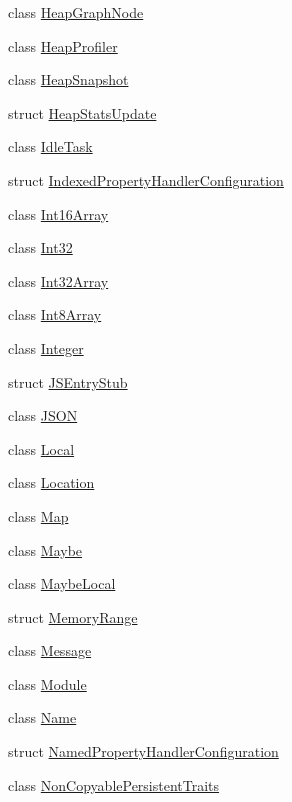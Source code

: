 \begin{DoxyCompactItemize}
\item 
class \mbox{\hyperlink{classv8_1_1HeapGraphNode}{Heap\+Graph\+Node}}
\item 
class \mbox{\hyperlink{classv8_1_1HeapProfiler}{Heap\+Profiler}}
\item 
class \mbox{\hyperlink{classv8_1_1HeapSnapshot}{Heap\+Snapshot}}
\item 
struct \mbox{\hyperlink{structv8_1_1HeapStatsUpdate}{Heap\+Stats\+Update}}
\item 
class \mbox{\hyperlink{classv8_1_1IdleTask}{Idle\+Task}}
\item 
struct \mbox{\hyperlink{structv8_1_1IndexedPropertyHandlerConfiguration}{Indexed\+Property\+Handler\+Configuration}}
\item 
class \mbox{\hyperlink{classv8_1_1Int16Array}{Int16\+Array}}
\item 
class \mbox{\hyperlink{classv8_1_1Int32}{Int32}}
\item 
class \mbox{\hyperlink{classv8_1_1Int32Array}{Int32\+Array}}
\item 
class \mbox{\hyperlink{classv8_1_1Int8Array}{Int8\+Array}}
\item 
class \mbox{\hyperlink{classv8_1_1Integer}{Integer}}
\item 
struct \mbox{\hyperlink{structv8_1_1JSEntryStub}{J\+S\+Entry\+Stub}}
\item 
class \mbox{\hyperlink{classv8_1_1JSON}{J\+S\+ON}}
\item 
class \mbox{\hyperlink{classv8_1_1Local}{Local}}
\item 
class \mbox{\hyperlink{classv8_1_1Location}{Location}}
\item 
class \mbox{\hyperlink{classv8_1_1Map}{Map}}
\item 
class \mbox{\hyperlink{classv8_1_1Maybe}{Maybe}}
\item 
class \mbox{\hyperlink{classv8_1_1MaybeLocal}{Maybe\+Local}}
\item 
struct \mbox{\hyperlink{structv8_1_1MemoryRange}{Memory\+Range}}
\item 
class \mbox{\hyperlink{classv8_1_1Message}{Message}}
\item 
class \mbox{\hyperlink{classv8_1_1Module}{Module}}
\item 
class \mbox{\hyperlink{classv8_1_1Name}{Name}}
\item 
struct \mbox{\hyperlink{structv8_1_1NamedPropertyHandlerConfiguration}{Named\+Property\+Handler\+Configuration}}
\item 
class \mbox{\hyperlink{classv8_1_1NonCopyablePersistentTraits}{Non\+Copyable\+Persistent\+Traits}}

\end{DoxyCompactItemize}
